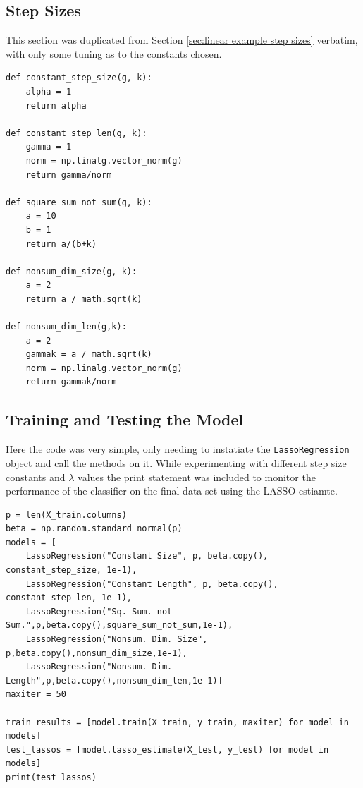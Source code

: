 \documentclass[journal,onecolumn]{IEEEtran}
\begin{document}
\subsection{Step Sizes}
This section was duplicated from Section \ref{sec:linear example step sizes} verbatim, with only some tuning as to the constants chosen.
\begin{verbatim}
def constant_step_size(g, k):
    alpha = 1
    return alpha

def constant_step_len(g, k):
    gamma = 1
    norm = np.linalg.vector_norm(g)
    return gamma/norm

def square_sum_not_sum(g, k):
    a = 10
    b = 1
    return a/(b+k)

def nonsum_dim_size(g, k):
    a = 2
    return a / math.sqrt(k)

def nonsum_dim_len(g,k):
    a = 2
    gammak = a / math.sqrt(k)
    norm = np.linalg.vector_norm(g)
    return gammak/norm
\end{verbatim}

\subsection{Training and Testing the Model}
Here the code was very simple, only needing to instatiate the \verb|LassoRegression| object and call the methods on it. While experimenting with different step size constants and \(\lambda\) values the print statement was included to monitor the performance of the classifier on the final data set using the LASSO estiamte.
\begin{verbatim}
p = len(X_train.columns)
beta = np.random.standard_normal(p)
models = [
    LassoRegression("Constant Size", p, beta.copy(), constant_step_size, 1e-1),
    LassoRegression("Constant Length", p, beta.copy(), constant_step_len, 1e-1),
    LassoRegression("Sq. Sum. not Sum.",p,beta.copy(),square_sum_not_sum,1e-1),
    LassoRegression("Nonsum. Dim. Size", p,beta.copy(),nonsum_dim_size,1e-1),
    LassoRegression("Nonsum. Dim. Length",p,beta.copy(),nonsum_dim_len,1e-1)]
maxiter = 50

train_results = [model.train(X_train, y_train, maxiter) for model in models]
test_lassos = [model.lasso_estimate(X_test, y_test) for model in models]
print(test_lassos)
\end{verbatim}
\end{document}
